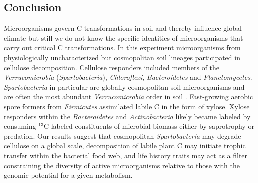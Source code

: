 \subsection{Conclusion} 
Microorganisms govern C-transformations in soil and thereby influence global
climate but still we do not know the specific identities of microorganisms that carry out 
critical C transformations. In this experiment microorganisms from physiologically
uncharacterized but cosmopolitan soil lineages participated in cellulose
decomposition. Cellulose responders included members of the
\textit{Verrucomicrobia} (\textit{Spartobacteria}), \textit{Chloroflexi},
\textit{Bacteroidetes} and \textit{Planctomycetes}. \textit{Spartobacteria} in
particular are globally cosmopolitan soil microorganisms and are often the most
abundant \textit{Verrucomicrobia} order in soil \citep{Bergmann_2011}.
Fast-growing aerobic spore formers from \textit{Firmicutes} assimilated labile
C in the form of xylose. Xylose responders within the \textit{Bacteroidetes}
and \textit{Actinobacteria} likely became labeled by consuming $^{13}$C-labeled
constituents of microbial biomass either by saprotrophy or predation. Our
results suggest that cosmopolitan \textit{Spartobacteria} may degrade cellulose
on a global scale, decomposition of labile plant C may initiate trophic transfer 
within the bacterial food web, and life history traits may act
as a filter constraining the diversity of active microorganisms relative to
those with the genomic potential for a given metabolism.
